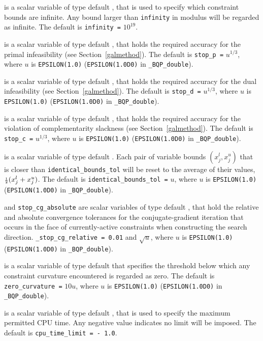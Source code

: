 \documentclass{galahad}
\newcommand{\packagename}{BQP}
\newcommand{\fullpackagename}{\libraryname\_\packagename}
\begin{document}
\begin{description}
 is a scalar variable of type default \realdp, that is used to
specify which constraint bounds are infinite.
Any bound larger than {\tt infinity} in modulus will be regarded as infinite.
The default is {\tt infinity =} $10^{19}$.

 is a scalar variable of type default \realdp, that holds the
required accuracy for the primal infeasibility (see Section~\ref{galmethod}).
The default is {\tt stop\_p =} $u^{1/3}$,
where $u$ is {\tt EPSILON(1.0)} ({\tt EPSILON(1.0D0)} in 
{\tt \fullpackagename\_double}).

 is a scalar variable of type default 
\realdp, that holds the
required accuracy for the dual infeasibility (see Section~\ref{galmethod}).
The default is {\tt stop\_d =} $u^{1/3}$,
where $u$ is {\tt EPSILON(1.0)} ({\tt EPSILON(1.0D0)} in 
{\tt \fullpackagename\_double}).

 is a scalar variable of type default 
\realdp, that holds the
required accuracy for the violation of complementarity slackness 
(see Section~\ref{galmethod}).
The default is {\tt stop\_c =} $u^{1/3}$,
where $u$ is {\tt EPSILON(1.0)} ({\tt EPSILON(1.0D0)} in 
{\tt \fullpackagename\_double}).

is a scalar variable of type default \realdp.
Each pair of variable bounds $(x_{j}^{l}, x_{j}^{u})$
that is closer than {\tt identical\_bounds\_tol} 
will be reset to the average of their values,
${\scriptstyle \frac{1}{2}} (x_{j}^{l} + x_{j}^{u})$.
The default is {\tt identical\_bounds\_tol =} $u$,
where $u$ is {\tt EPSILON(1.0)} ({\tt EPSILON(1.0D0)} in 
{\tt \fullpackagename\_double}).

 and {\tt stop\_cg\_absolute} 
are scalar variables of type default \realdp, 
that hold the relative and absolute convergence tolerances for the
conjugate-gradient iteration that occurs in the face of currently-active
constraints when constructing the search direction.
{\tt \_stop\_cg\_relative = 0.01}
and  $\sqrt{u}$,
where $u$ is {\tt EPSILON(1.0)} ({\tt EPSILON(1.0D0)} in 
{\tt \fullpackagename\_double}).

 is a scalar variable of type default \realdp
that specifies the threshold below which any constraint curvature
encountered is regarded as zero.
The default is {\tt zero\_curvature =} $10 u$,
where $u$ is {\tt EPSILON(1.0)} ({\tt EPSILON(1.0D0)} in 
{\tt \fullpackagename\_double}).

 is a scalar variable of type default \realdp, 
that is used to specify the maximum permitted CPU time. Any negative
value indicates no limit will be imposed. The default is 
{\tt cpu\_time\_limit = - 1.0}.


\end{description}
\end{document}
